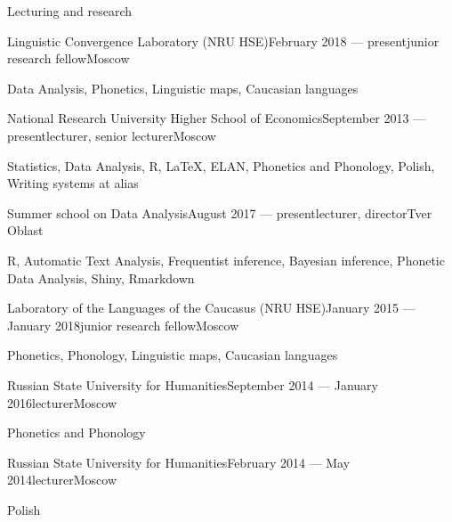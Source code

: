 \documentclass{resume} %
\begin{document}
\begin{rSection}{Lecturing and research}
\begin{rSubsection}{Linguistic Convergence Laboratory (NRU HSE)}{February 2018 --- present}{junior research fellow}{Moscow}
\item Data Analysis, Phonetics, Linguistic maps, Caucasian languages
\end{rSubsection}
\begin{rSubsection}{National Research University Higher School of Economics}{September 2013 --- present}{lecturer, senior lecturer}{Moscow}
\item Statistics, Data Analysis, R, \LaTeX, ELAN, Phonetics and Phonology, Polish, Writing systems at alias
\end{rSubsection}
\begin{rSubsection}{Summer school on Data Analysis}{August 2017 --- present}{lecturer, director}{Tver Oblast}
\item R, Automatic Text Analysis, Frequentist inference, Bayesian inference, Phonetic Data Analysis, Shiny, Rmarkdown
\end{rSubsection}
\begin{rSubsection}{Laboratory of the Languages of the Caucasus (NRU HSE)}{January 2015 --- January 2018}{junior research fellow}{Moscow}
\item Phonetics, Phonology, Linguistic maps, Caucasian languages
\end{rSubsection}
\begin{rSubsection}{Russian State University for Humanities}{September 2014 --- January 2016}{lecturer}{Moscow}
\item Phonetics and Phonology
\end{rSubsection}
\begin{rSubsection}{Russian State University for Humanities}{February 2014 --- May 2014}{lecturer}{Moscow}
\item Polish
\end{rSubsection}

\end{rSection}
\clearpage
\end{document}

